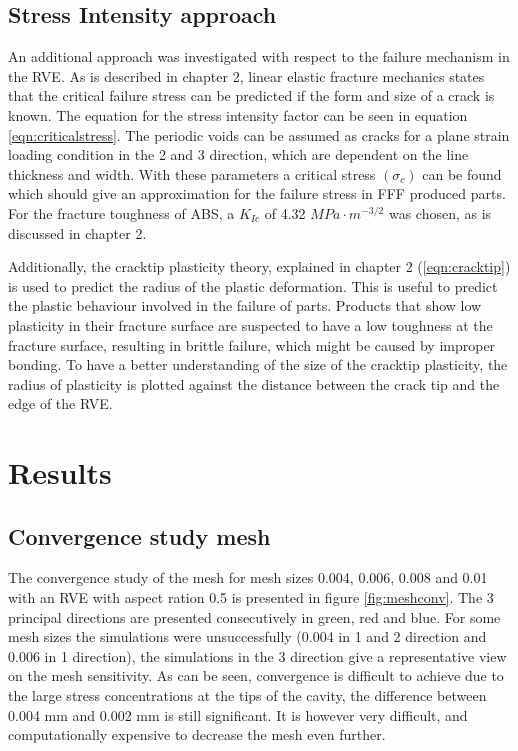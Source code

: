 \subsection{Stress Intensity approach}
An additional approach was investigated with respect to the failure mechanism in the RVE. As is described in chapter 2, linear elastic fracture mechanics states that the critical failure stress can be predicted if the form and size of a crack is known. The equation for the stress intensity factor can be seen in equation \ref{eqn:criticalstress}. The periodic voids can be assumed as cracks for a plane strain loading condition in the 2 and 3 direction, which are dependent on the line thickness and width. With these parameters a critical stress $(\sigma_c)$ can be found which should give an approximation for the failure stress in FFF produced parts.  For the fracture toughness of ABS, a $K_{Ic}$ of  4.32 $MPa \cdot m^{-3/2}$ was chosen, as is discussed in chapter 2.

Additionally, the cracktip plasticity theory, explained in chapter 2 (\ref{eqn:cracktip}) is used to predict the radius of the plastic deformation. This is useful to predict the plastic behaviour involved in the failure of parts. Products that show low plasticity in their fracture surface are suspected to have a low toughness at the fracture surface, resulting in brittle failure, which might be caused by improper  bonding. To have a better understanding of the size of the cracktip plasticity, the radius of plasticity is plotted against the distance between the crack tip and the edge of the RVE. 

\section{Results}
\subsection{Convergence study mesh}
The convergence study of the mesh for mesh sizes 0.004, 0.006, 0.008 and 0.01 with an RVE with aspect ration 0.5 is presented in figure \ref{fig:meshconv}. The 3 principal directions are presented consecutively in green, red and blue. For some mesh sizes the simulations were unsuccessfully (0.004 in 1 and 2 direction and 0.006 in 1 direction), the simulations in the 3 direction give a representative view on the mesh sensitivity.  As can be seen,  convergence is difficult to achieve due to the large stress concentrations at the tips of the cavity, the difference between 0.004 mm and 0.002 mm is still significant. It is however very difficult, and computationally expensive to decrease the mesh even further.  

